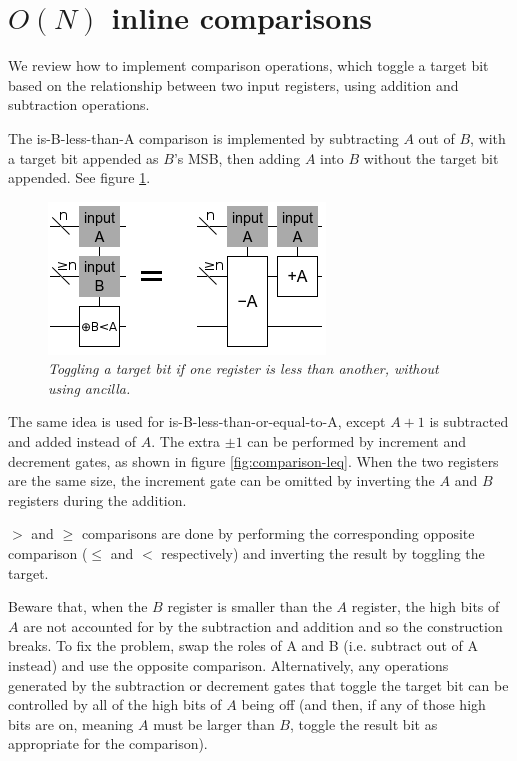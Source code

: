 \documentclass[twocolumn]{article}
\begin{document}
\section{$O(N)$ inline comparisons}

We review how to implement comparison operations, which toggle a target bit based on the relationship between two input registers, using addition and subtraction operations.

The is-B-less-than-A comparison is implemented by subtracting $A$ out of $B$, with a target bit appended as $B$'s MSB, then adding $A$ into $B$ without the target bit appended.
See figure \ref{fig:comparison-less}.

\begin{figure}
  \centering
  \includegraphics[totalheight=3cm]{comparison-less.png}
  \caption{\em Toggling a target bit if one register is less than another, without using ancilla.}
  \label{fig:comparison-less}
\end{figure}

The same idea is used for is-B-less-than-or-equal-to-A, except $A+1$ is subtracted and added instead of $A$.
The extra $\pm 1$ can be performed by increment and decrement gates, as shown in figure \ref{fig:comparison-leq}.
When the two registers are the same size, the increment gate can be omitted by inverting the $A$ and $B$ registers during the addition.

$>$ and $\geq$ comparisons are done by performing the corresponding opposite comparison ($\leq$ and $<$ respectively) and inverting the result by toggling the target.

Beware that, when the $B$ register is smaller than the $A$ register, the high bits of $A$ are not accounted for by the subtraction and addition and so the construction breaks.
To fix the problem, swap the roles of A and B (i.e. subtract out of A instead) and use the opposite comparison.
Alternatively, any operations generated by the subtraction or decrement gates that toggle the target bit can be controlled by all of the high bits of $A$ being off (and then, if any of those high bits are on, meaning $A$ must be larger than $B$, toggle the result bit as appropriate for the comparison).
\end{document}
